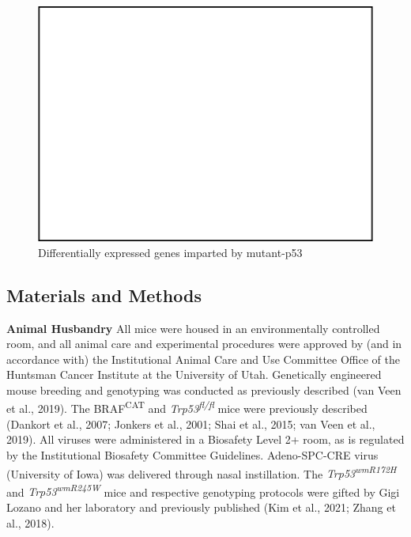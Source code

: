 \begin{figure}
\hypertarget{fig:04}{%
\centering
\includegraphics[width=1\textwidth,height=\textheight]{images/scrna_5.png}
\caption{Differentially expressed genes imparted by mutant-p53}\label{fig:04}
}
\end{figure}

\hypertarget{materials-and-methods}{%
\subsection{Materials and Methods}\label{materials-and-methods}}

\textbf{Animal Husbandry} All mice were housed in an environmentally controlled room, and all animal care and experimental procedures were approved by (and in accordance with) the Institutional Animal Care and Use Committee Office of the Huntsman Cancer Institute at the University of Utah. Genetically engineered mouse breeding and genotyping was conducted as previously described (van Veen et al., 2019). The BRAF\textsuperscript{CAT} and \emph{Trp53\textsuperscript{fl/fl}} mice were previously described (Dankort et al., 2007; Jonkers et al., 2001; Shai et al., 2015; van Veen et al., 2019). All viruses were administered in a Biosafety Level 2+ room, as is regulated by the Institutional Biosafety Committee Guidelines. Adeno-SPC-CRE virus (University of Iowa) was delivered through nasal instillation. The \emph{Trp53\textsuperscript{wmR172H}} and \emph{Trp53\textsuperscript{wmR245W}} mice and respective genotyping protocols were gifted by Gigi Lozano and her laboratory and previously published (Kim et al., 2021; Zhang et al., 2018).

